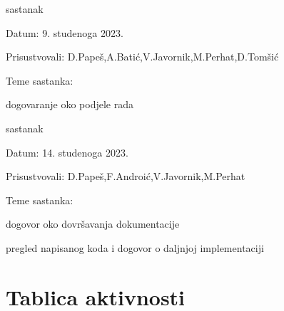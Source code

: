 \begin{packed_enum}
			\item  sastanak
			\item[] \begin{packed_item}
				\item Datum: 9. studenoga 2023.
				\item Prisustvovali: D.Papeš,A.Batić,V.Javornik,M.Perhat,D.Tomšić
				\item Teme sastanka:
				\begin{packed_item}
					\item dogovaranje oko podjele rada
				\end{packed_item}
			\end{packed_item}			
			
			\item  sastanak
			\item[] \begin{packed_item}
				\item Datum: 14. studenoga 2023.
				\item Prisustvovali: D.Papeš,F.Androić,V.Javornik,M.Perhat
				\item Teme sastanka:
				\begin{packed_item}
					\item dogovor oko dovršavanja dokumentacije
					\item pregled napisanog koda i dogovor o daljnjoj implementaciji
				\end{packed_item}
			\end{packed_item}	
			
			
		\end{packed_enum}
		
		\eject
		\section*{Tablica aktivnosti}


